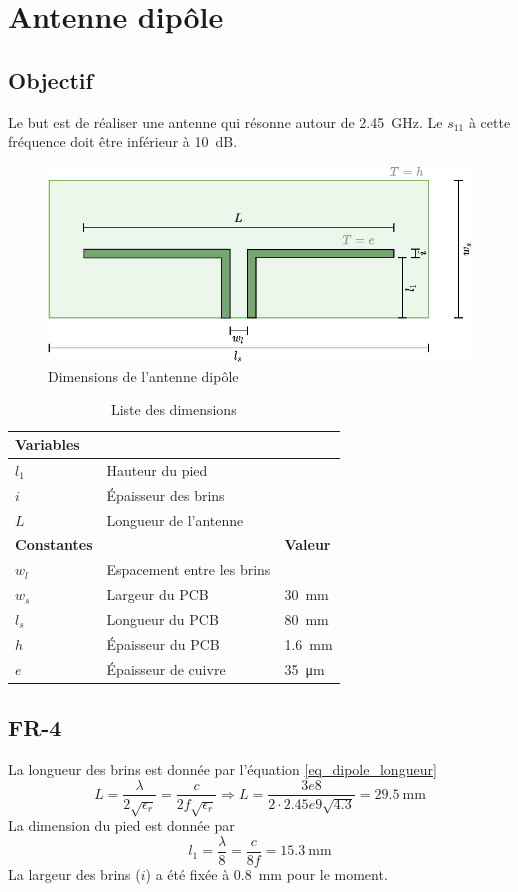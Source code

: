 \documentclass[Deriaz_Traiber_Labo02]{subfiles}
\begin{document}
\chapter{Antenne dipôle}
\section{Objectif}
Le but est de réaliser une antenne qui résonne autour de \SI{2.45}{\giga\hertz}. Le $s_{11}$ à cette fréquence doit être inférieur à \SI{10}{\deci\bel}.


\begin{figure}[H]
\centering
\includegraphics[scale=1,page=1]{../Schemas-crop.pdf}
\caption{Dimensions de l'antenne dipôle}
\end{figure}
\begin{table}[H]
\centering
\begin{tabular}{lll}
\textbf{Variables}\\\hline
$l_1$ & Hauteur du pied\\
$i$ & Épaisseur des brins\\
$L$ & Longueur de l'antenne\\
\textbf{Constantes} & & \textbf{Valeur}\\\hline
$w_l$ & Espacement entre les brins\\
$w_s$ & Largeur du PCB & \SI{30}{\milli\meter}\\
$l_s$ & Longueur du PCB & \SI{80}{\milli\meter}\\
$h$ & Épaisseur du PCB & \SI{1.6}{\milli\meter}\\
$e$ & Épaisseur de cuivre & \SI{35}{\micro\meter}
\end{tabular}
\caption{Liste des dimensions}
\end{table}


\section{FR-4}
La longueur des brins est donnée par l'équation \ref{eq_dipole_longueur}
\begin{equation}
\boxed{L = \dfrac{\lambda}{2\sqrt{\epsilon_r}} = \dfrac{c}{2 f \sqrt{\epsilon_r}}} \Rightarrow \boxed{L = \dfrac{3e8}{2\cdot2.45e9\sqrt{4.3}}=\SI{29.5}{\milli\meter}}
\label{eq_dipole_longueur}
\end{equation}
La dimension du pied est donnée par
\begin{equation}
\boxed{l_1=\frac{\lambda}{8}=\frac{c}{8f}=\SI{15.3}{\milli\meter}}
\end{equation}
La largeur des brins ($i$) a été fixée à \SI{0.8}{\milli\meter} pour le moment.
\end{document}

